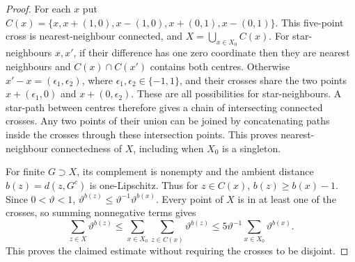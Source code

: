 \begin{proof}
For each \(x\) put
\(C(x)=\{x,x+(1,0),x-(1,0),x+(0,1),x-(0,1)\}\).
This five-point cross is nearest-neighbour connected,
and \(X=\bigcup_{x\in X_0}C(x)\).
For star-neighbours \(x,x'\), if their difference has
one zero coordinate then they are nearest neighbours
and \(C(x)\cap C(x')\) contains both centres.
Otherwise \(x'-x=(\epsilon_1,\epsilon_2)\), where
\(\epsilon_1,\epsilon_2\in\{-1,1\}\), and their crosses
share the two points \(x+(\epsilon_1,0)\) and
\(x+(0,\epsilon_2)\).  These are all possibilities for
star-neighbours.  A star-path between centres therefore
gives a chain of intersecting connected crosses.  Any
two points of their union can be joined by concatenating
paths inside the crosses through these intersection
points.  This proves nearest-neighbour connectedness
of \(X\), including when \(X_0\) is a singleton.

For finite \(G\supset X\), its complement is nonempty
and the ambient distance \(b(z)=d(z,G^c)\) is
one-Lipschitz.  Thus for \(z\in C(x)\),
\(b(z)\ge b(x)-1\).  Since \(0<\vartheta<1\),
\(\vartheta^{b(z)}\le\vartheta^{-1}\vartheta^{b(x)}\).
Every point of \(X\) is in at least one of the crosses,
so summing nonnegative terms gives
\[
 \sum_{z\in X}\vartheta^{b(z)}
    \le\sum_{x\in X_0}\sum_{z\in C(x)}\vartheta^{b(z)}
    \le5\vartheta^{-1}\sum_{x\in X_0}\vartheta^{b(x)}.
\]
This proves the claimed estimate without requiring
the crosses to be disjoint.
\end{proof}
